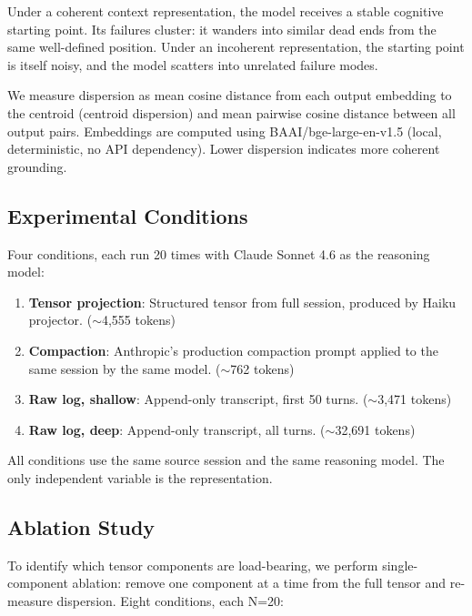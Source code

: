 \documentclass[11pt]{article}
\begin{document}
Under a coherent context representation, the model receives a stable
cognitive starting point. Its failures cluster: it wanders into similar
dead ends from the same well-defined position. Under an incoherent
representation, the starting point is itself noisy, and the model
scatters into unrelated failure modes.

We measure dispersion as mean cosine distance from each output
embedding to the centroid (centroid dispersion) and mean pairwise
cosine distance between all output pairs. Embeddings are computed
using BAAI/bge-large-en-v1.5 (local, deterministic, no API
dependency). Lower dispersion indicates more coherent grounding.

\subsection{Experimental Conditions}

Four conditions, each run 20 times with Claude Sonnet 4.6 as the
reasoning model:

\begin{enumerate}
\item[\textbf{A}] \textbf{Tensor projection}: Structured tensor from
  full session, produced by Haiku projector. ($\sim$4,555 tokens)
\item[\textbf{B}] \textbf{Compaction}: Anthropic's production
  compaction prompt applied to the same session by the same model.
  ($\sim$762 tokens)
\item[\textbf{C}] \textbf{Raw log, shallow}: Append-only transcript,
  first 50 turns. ($\sim$3,471 tokens)
\item[\textbf{D}] \textbf{Raw log, deep}: Append-only transcript,
  all turns. ($\sim$32,691 tokens)
\end{enumerate}

All conditions use the same source session and the same reasoning
model. The only independent variable is the representation.

\subsection{Ablation Study}

To identify which tensor components are load-bearing, we perform
single-component ablation: remove one component at a time from the
full tensor and re-measure dispersion. Eight conditions, each N=20:
\end{document}
